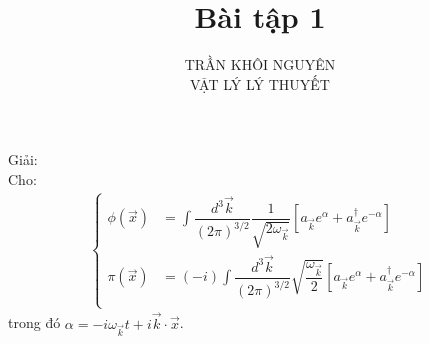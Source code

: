\documentclass{report}
\title{\Huge{Bài tập 1}}
\begin{document}
\setlength{\parindent}{20pt}
\newpage
\author{TRẦN KHÔI NGUYÊN \\ VẬT LÝ LÝ THUYẾT}
\maketitle
Giải:\\
Cho:
\begin{align*}
	\begin{cases}
		\phi(\vec{x}) & = \displaystyle \int \dfrac{d^3\vec{k}}{(2\pi)^{3/2}} \dfrac{1}{\sqrt{2\omega_{\vec{k}}}}\left[ a_{\vec{k}}e^\alpha + a_{\vec{k}}^\dagger e^{-\alpha} \right]     \\
		\pi(\vec{x})  & = (-i)\displaystyle \int \dfrac{d^3\vec{k}}{(2\pi)^{3/2}} \sqrt{\dfrac{\omega_{\vec{k}}}{2}} \left[ a_{\vec{k}}e^\alpha + a_{\vec{k}}^\dagger e^{-\alpha} \right] \\
	\end{cases}
\end{align*}
trong đó $\alpha = -i\omega_{\vec{k}} t + i\vec{k}\cdot\vec{x}$.
\end{document}
